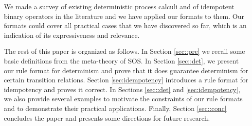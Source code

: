 We made a survey of existing deterministic process calculi and
of idempotent binary operators in the literature and we have applied our formats to them.
Our formats could cover all practical cases that we have discovered so far,
which is an indication of its expressiveness and relevance.

The rest of this paper is organized as follows. In Section \ref{sec::pre} we recall some basic definitions from the meta-theory of SOS.
In Section \ref{sec::det}, we present our rule format for determinism and prove that it does guarantee determinism for certain transition relations.
Section \ref{sec:idempotency} introduces a rule format for idempotency and proves it correct.
In Sections \ref{sec::det} and \ref{sec:idempotency},  we also provide several examples to motivate
the constraints of our rule formats and to demonstrate their practical applications.
Finally, Section \ref{sec::conc} concludes the paper and presents some directions for future research. 